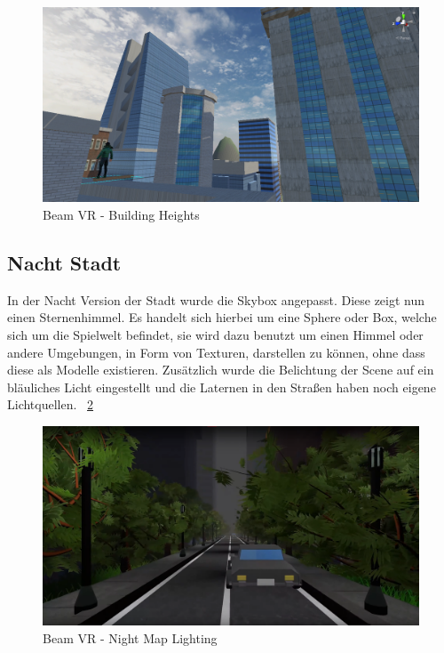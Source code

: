 \begin {figure}
    \centering
    \includegraphics[scale=0.5]{pics/beamvr_city_day_heights}
    \caption{Beam VR - Building Heights}
    \label{fig:beamvr_building-heights}
\end {figure}

\subsection{Nacht Stadt}\label{subsec:night-city}
In der Nacht Version der Stadt wurde die Skybox angepasst.
Diese zeigt nun einen Sternenhimmel.
Es handelt sich hierbei um eine Sphere oder Box, welche sich um die Spielwelt befindet, sie wird dazu benutzt um einen Himmel oder andere Umgebungen,
in Form von Texturen, darstellen zu können, ohne dass diese als Modelle existieren.
Zus\"atzlich wurde die Belichtung der Scene auf ein bl\"auliches Licht eingestellt und die Laternen in den Straßen
haben noch eigene Lichtquellen.
~\ref{fig:beamvr_night_map_lighting}

\begin {figure}
    \centering
    \includegraphics[scale=0.3]{pics/beamvr_night_overview}
    \caption{Beam VR - Night Map Lighting}
    \label{fig:beamvr_night_map_lighting}
\end {figure}

